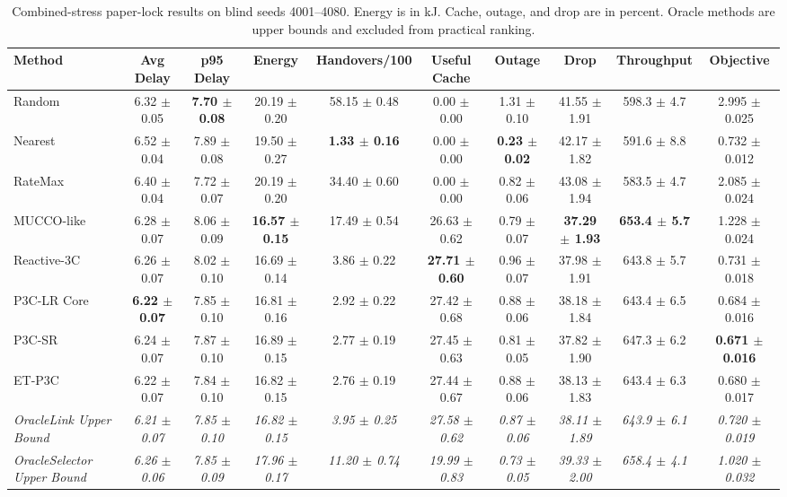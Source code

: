 \begin{table}[!t]
\centering
\caption{Combined-stress paper-lock results on blind seeds 4001--4080. Energy is in kJ. Cache, outage, and drop are in percent. Oracle methods are upper bounds and excluded from practical ranking.}
\label{tab:main_results}
\tiny
\begin{tabular}{lccccccccc}
\toprule
Method & Avg Delay & p95 Delay & Energy & Handovers/100 & Useful Cache & Outage & Drop & Throughput & Objective \\
\midrule
Random & 6.32 $\pm$ 0.05 & \textbf{7.70 $\pm$ 0.08} & 20.19 $\pm$ 0.20 & 58.15 $\pm$ 0.48 & 0.00 $\pm$ 0.00 & 1.31 $\pm$ 0.10 & 41.55 $\pm$ 1.91 & 598.3 $\pm$ 4.7 & 2.995 $\pm$ 0.025 \\
Nearest & 6.52 $\pm$ 0.04 & 7.89 $\pm$ 0.08 & 19.50 $\pm$ 0.27 & \textbf{1.33 $\pm$ 0.16} & 0.00 $\pm$ 0.00 & \textbf{0.23 $\pm$ 0.02} & 42.17 $\pm$ 1.82 & 591.6 $\pm$ 8.8 & 0.732 $\pm$ 0.012 \\
RateMax & 6.40 $\pm$ 0.04 & 7.72 $\pm$ 0.07 & 20.19 $\pm$ 0.20 & 34.40 $\pm$ 0.60 & 0.00 $\pm$ 0.00 & 0.82 $\pm$ 0.06 & 43.08 $\pm$ 1.94 & 583.5 $\pm$ 4.7 & 2.085 $\pm$ 0.024 \\
MUCCO-like & 6.28 $\pm$ 0.07 & 8.06 $\pm$ 0.09 & \textbf{16.57 $\pm$ 0.15} & 17.49 $\pm$ 0.54 & 26.63 $\pm$ 0.62 & 0.79 $\pm$ 0.07 & \textbf{37.29 $\pm$ 1.93} & \textbf{653.4 $\pm$ 5.7} & 1.228 $\pm$ 0.024 \\
Reactive-3C & 6.26 $\pm$ 0.07 & 8.02 $\pm$ 0.10 & 16.69 $\pm$ 0.14 & 3.86 $\pm$ 0.22 & \textbf{27.71 $\pm$ 0.60} & 0.96 $\pm$ 0.07 & 37.98 $\pm$ 1.91 & 643.8 $\pm$ 5.7 & 0.731 $\pm$ 0.018 \\
P3C-LR Core & \textbf{6.22 $\pm$ 0.07} & 7.85 $\pm$ 0.10 & 16.81 $\pm$ 0.16 & 2.92 $\pm$ 0.22 & 27.42 $\pm$ 0.68 & 0.88 $\pm$ 0.06 & 38.18 $\pm$ 1.84 & 643.4 $\pm$ 6.5 & 0.684 $\pm$ 0.016 \\
P3C-SR & 6.24 $\pm$ 0.07 & 7.87 $\pm$ 0.10 & 16.89 $\pm$ 0.15 & 2.77 $\pm$ 0.19 & 27.45 $\pm$ 0.63 & 0.81 $\pm$ 0.05 & 37.82 $\pm$ 1.90 & 647.3 $\pm$ 6.2 & \textbf{0.671 $\pm$ 0.016} \\
ET-P3C & 6.22 $\pm$ 0.07 & 7.84 $\pm$ 0.10 & 16.82 $\pm$ 0.15 & 2.76 $\pm$ 0.19 & 27.44 $\pm$ 0.67 & 0.88 $\pm$ 0.06 & 38.13 $\pm$ 1.83 & 643.4 $\pm$ 6.3 & 0.680 $\pm$ 0.017 \\
\textit{OracleLink Upper Bound} & \textit{6.21 $\pm$ 0.07} & \textit{7.85 $\pm$ 0.10} & \textit{16.82 $\pm$ 0.15} & \textit{3.95 $\pm$ 0.25} & \textit{27.58 $\pm$ 0.62} & \textit{0.87 $\pm$ 0.06} & \textit{38.11 $\pm$ 1.89} & \textit{643.9 $\pm$ 6.1} & \textit{0.720 $\pm$ 0.019} \\
\textit{OracleSelector Upper Bound} & \textit{6.26 $\pm$ 0.06} & \textit{7.85 $\pm$ 0.09} & \textit{17.96 $\pm$ 0.17} & \textit{11.20 $\pm$ 0.74} & \textit{19.99 $\pm$ 0.83} & \textit{0.73 $\pm$ 0.05} & \textit{39.33 $\pm$ 2.00} & \textit{658.4 $\pm$ 4.1} & \textit{1.020 $\pm$ 0.032} \\
\bottomrule
\end{tabular}
\end{table}

